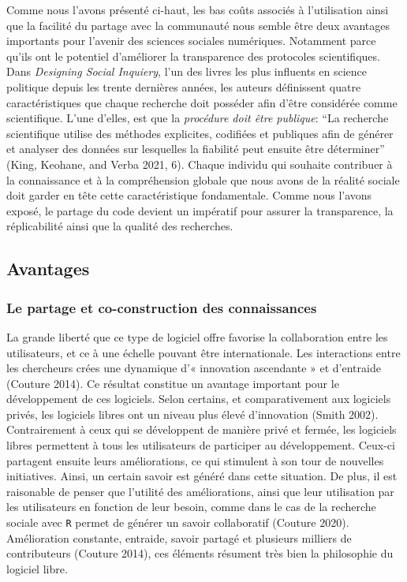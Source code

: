 \documentclass[
  letterpaper,
]{scrbook}
\begin{document}
Comme nous l'avons présenté ci-haut, les bas coûts associés à
l'utilisation ainsi que la facilité du partage avec la communauté nous
semble être deux avantages importants pour l'avenir des sciences
sociales numériques. Notamment parce qu'ils ont le potentiel d'améliorer
la transparence des protocoles scientifiques. Dans \emph{Designing
Social Inquiery}, l'un des livres les plus influents en science
politique depuis les trente dernières années, les auteurs définissent
quatre caractéristiques que chaque recherche doit posséder afin d'être
considérée comme scientifique. L'une d'elles, est que la \emph{procédure
doit être publique}: ``La recherche scientifique utilise des méthodes
explicites, codifiées et publiques afin de générer et analyser des
données sur lesquelles la fiabilité peut ensuite être déterminer''
(King, Keohane, and Verba 2021, 6). Chaque individu qui souhaite
contribuer à la connaissance et à la compréhension globale que nous
avons de la réalité sociale doit garder en tête cette caractéristique
fondamentale. Comme nous l'avons exposé, le partage du code devient un
impératif pour assurer la transparence, la réplicabilité ainsi que la
qualité des recherches.

\hypertarget{avantages}{%
\subsection{Avantages}\label{avantages}}

\hypertarget{le-partage-et-co-construction-des-connaissances}{%
\subsubsection{Le partage et co-construction des
connaissances}\label{le-partage-et-co-construction-des-connaissances}}

La grande liberté que ce type de logiciel offre favorise la
collaboration entre les utilisateurs, et ce à une échelle pouvant être
internationale. Les interactions entre les chercheurs crées une
dynamique d'« innovation ascendante » et d'entraide (Couture 2014). Ce
résultat constitue un avantage important pour le développement de ces
logiciels. Selon certains, et comparativement aux logiciels privés, les
logiciels libres ont un niveau plus élevé d'innovation (Smith 2002).
Contrairement à ceux qui se développent de manière privé et fermée, les
logiciels libres permettent à tous les utilisateurs de participer au
développement. Ceux-ci partagent ensuite leurs améliorations, ce qui
stimulent à son tour de nouvelles initiatives. Ainsi, un certain savoir
est généré dans cette situation. De plus, il est raisonable de penser
que l'utilité des améliorations, ainsi que leur utilisation par les
utilisateurs en fonction de leur besoin, comme dans le cas de la
recherche sociale avec \texttt{R} permet de générer un savoir
collaboratif (Couture 2020). Amélioration constante, entraide, savoir
partagé et plusieurs milliers de contributeurs (Couture 2014), ces
éléments résument très bien la philosophie du logiciel libre.
\end{document}

